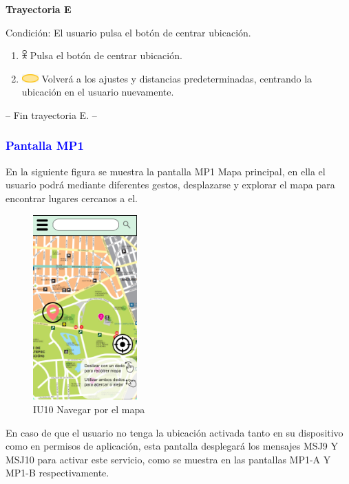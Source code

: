 \textbf{Trayectoria E}

Condición: El usuario pulsa el botón de centrar ubicación.
\begin{enumerate}
    \item \includegraphics[width=0.0150\textwidth]{Figuras/persona.png} Pulsa el botón de centrar ubicación.
    \item \includegraphics[width=0.0500\textwidth]{Figuras/sistema.png} Volverá a los ajustes y distancias predeterminadas, centrando la ubicación en el usuario nuevamente.
    \end{enumerate}
-- Fin trayectoria E. --\\



\subsubsection{\textcolor{blue}{Pantalla MP1}}
En la siguiente figura se muestra la pantalla MP1 Mapa principal, en ella el usuario podrá mediante diferentes gestos, desplazarse y explorar el mapa para encontrar lugares cercanos a el. 

    \begin{figure}[htb]
        \centering
        \includegraphics[width= 4cm]{Pantallas Prototipo3/IU10 - Mapa principal.jpg}
        \caption{IU10 Navegar por el mapa}
        \label{fig:enter-label}
    \end{figure}

En caso de que el usuario no tenga la ubicación activada tanto en su dispositivo como en permisos de aplicación, esta pantalla desplegará los mensajes MSJ9 Y MSJ10 para activar este servicio, como se muestra en las pantallas MP1-A Y MP1-B respectivamente.

